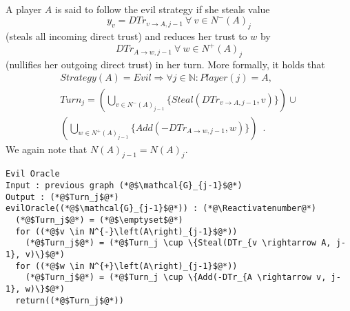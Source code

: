 \documentclass[11pt]{llncs}
\makeatletter
\newcommand*\Suppressnumber{%
  \lst@AddToHook{OnNewLine}{%
    \let\thelstnumber\relax%
     \advance\c@lstnumber-\@ne\relax%
    }%
}
\makeatother
\begin{document}
     \begin{definition} \ \\
        A player $A$ is said to follow the evil strategy if she steals value
        \begin{equation}
           y_v = DTr_{v \rightarrow A, j-1} \: \forall \: v \in N^{-}\left(A\right)_j
        \end{equation}
        (steals all incoming direct trust) and reduces her trust to $w$ by
        \begin{equation}
           DTr_{A \rightarrow w, j-1} \: \forall \: w \in N^{+}\left(A\right)_j
        \end{equation}
        (nullifies her outgoing direct trust) in her turn.
        More formally, it holds that
        \begin{equation}
        \begin{gathered}
           Strategy\left(A\right) = Evil \Rightarrow \forall j \in \mathbb{N} : Player\left(j\right) = A, \\
           Turn_j = \left(\bigcup\limits_{v \in N^{-}\left(A\right)_{j-1}}\{Steal(DTr_{v \rightarrow A, j-1}, v)\}\right)
           \cup \\ \left(\bigcup\limits_{w \in N^{+}\left(A\right)_{j-1}}\{Add\left(-DTr_{A \rightarrow w, j-1},
           w\right)\}\right) \enspace.
        \end{gathered}
        \end{equation}
        We again note that $N(A)_{j-1} = N(A)_j$.
     \end{definition}
     \Suppressnumber
     \begin{lstlisting}[label=eviloracle, style=numbers]
Evil Oracle
Input : previous graph (*@$\mathcal{G}_{j-1}$@*)
Output : (*@$Turn_j$@*)
evilOracle((*@$\mathcal{G}_{j-1}$@*)) : (*@\Reactivatenumber@*)
  (*@$Turn_j$@*) = (*@$\emptyset$@*)
  for ((*@$v \in N^{-}\left(A\right)_{j-1}$@*))
    (*@$Turn_j$@*) = (*@$Turn_j \cup \{Steal(DTr_{v \rightarrow A, j-1}, v)\}$@*)
  for ((*@$w \in N^{+}\left(A\right)_{j-1}$@*))
    (*@$Turn_j$@*) = (*@$Turn_j \cup \{Add(-DTr_{A \rightarrow v, j-1}, w)\}$@*)
  return((*@$Turn_j$@*))
     \end{lstlisting}
\end{document}
